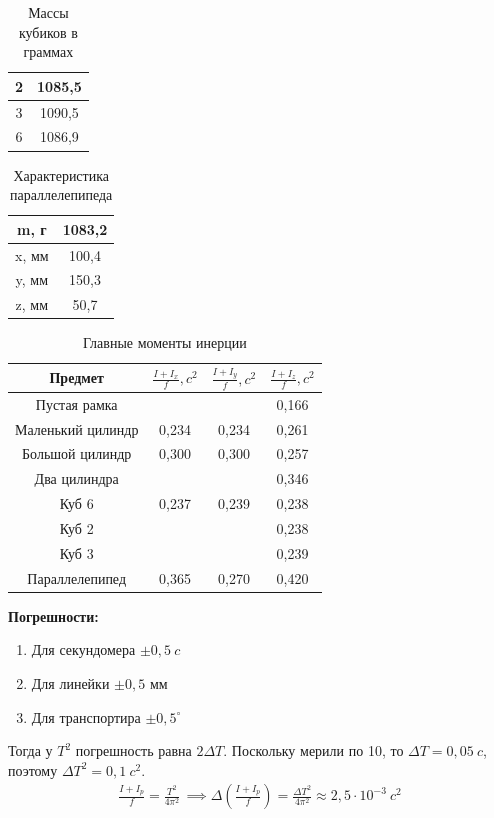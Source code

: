 \begin{table}[!h]
   \centering
   \caption{Массы кубиков в граммах}
   \begin{tabular}{|c|c|}
   \hline
       2 & 1085,5  \\ \hline
       3 & 1090,5  \\ \hline
       6 & 1086,9  \\ \hline
   \end{tabular}
\end{table}
\begin{table}[!ht]
   \centering
   \caption{Характеристика параллелепипеда}
   \begin{tabular}{|c|c|}
   \hline
       m, г & 1083,2 \\ \hline
       x, мм & 100,4 \\ \hline
       y, мм & 150,3 \\ \hline
       z, мм & 50,7 \\ \hline
   \end{tabular}
\end{table}

 \begin{table}[!ht]
   \caption{Главные моменты инерции}
   \centering
   \begin{tabular}{|c|c|c|c|}
   \hline
       Предмет & $ \frac{I + I_x}{f}, c^2 $ & $ \frac{I + I_y}{f}, c^2 $ & $ \frac{I + I_z}{f}, c^2 $ \\ \hline
       Пустая рамка & ~ & ~ &  0,166  \\ \hline
       Маленький цилиндр &  0,234  &  0,234  &  0,261  \\ \hline
       Большой цилиндр &  0,300  &  0,300  &  0,257  \\ \hline
       Два цилиндра & ~ & ~ &  0,346  \\ \hline
       Куб 6 &  0,237  &  0,239  &  0,238  \\ \hline
       Куб 2 & ~ & ~ &  0,238  \\ \hline
       Куб 3 & ~ & ~ &  0,239  \\ \hline
       Параллелепипед &  0,365  &  0,270  &  0,420 \\ \hline
   \end{tabular}
\end{table}
\newpage
\textbf{Погрешности:}\begin{enumerate}
   \item  Для секундомера $ \pm 0,5~c $
   \item Для линейки $ \pm 0,5\text{ мм } $
   \item Для транспортира $ \pm 0,5^\circ $
\end{enumerate}
Тогда у $ T^2 $ погрешность равна $ 2\Delta T$. Поскольку мерили по 10, то $ \Delta T = 0,05~c $, поэтому $ \Delta T^2 = 0,1~c^2 $. \begin{gather}
   \frac{I + I_p}{f} = \frac{T^2}{4\pi^2}\, \implies \Delta\left(\frac{I + I_p}{f}\right) = \frac{\Delta T^2}{4\pi^2} \approx 2,5 \cdot 10^{ - 3}~c^2
\end{gather}
 

